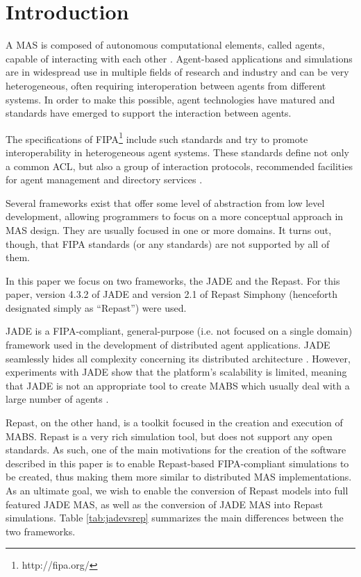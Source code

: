\section{Introduction} %
\label{sec:introduction}

A \gls{MAS} is composed of autonomous computational elements, called agents, capable of interacting with each other \cite{wooldridge2008introduction}.
Agent-based applications and simulations are in widespread use in multiple fields of research and industry and can be very heterogeneous, often requiring interoperation between agents from different systems.
In order to make this possible, agent technologies have matured and standards have emerged to support the interaction between agents.

The specifications of \gls{FIPA}\footnote{http://fipa.org/} include such standards and try to promote interoperability in heterogeneous agent systems.
These standards define not only a common \gls{ACL}, but also a group of interaction protocols, recommended facilities for agent management and directory services \cite{o1998fipa}.

Several frameworks exist \cite{survey} that offer some level of abstraction from low level development, allowing programmers to focus on a more conceptual approach in \gls{MAS} design.
They are usually focused in one or more domains.
It turns out, though, that \gls{FIPA} standards (or any standards) are not supported by all of them.

In this paper we focus on two frameworks, the \gls{JADE} and the \gls{Repast}. For this paper, version 4.3.2 of JADE and version 2.1 of Repast Simphony (henceforth designated simply as ``Repast'') were used.

\gls{JADE} is a \gls{FIPA}-compliant, general-purpose (i.e. not focused on a single domain) framework used in the development of distributed agent applications.
\gls{JADE} seamlessly hides all complexity concerning its distributed architecture \cite{bellifemine2003JADE}.
However, experiments with \gls{JADE} show that the platform's scalability is limited, meaning that \gls{JADE} is not an appropriate tool to create MABS which usually deal with a large number of agents \cite{mengistu2008scalability}.

Repast, on the other hand, is a toolkit focused in the creation and execution of \gls{MABS}. Repast \cite{repSimph} is a very rich simulation tool, but does not support any open standards. As such, one of the main motivations for the creation of the software described in this paper is to enable Repast-based \gls{FIPA}-compliant simulations to be created, thus making them more similar to distributed MAS implementations. As an ultimate goal, we wish to enable the conversion of Repast models into full featured \gls{JADE} MAS, as well as the conversion of \gls{JADE} MAS into Repast simulations. Table \ref{tab:jadevsrep} summarizes the main differences between the two frameworks.

